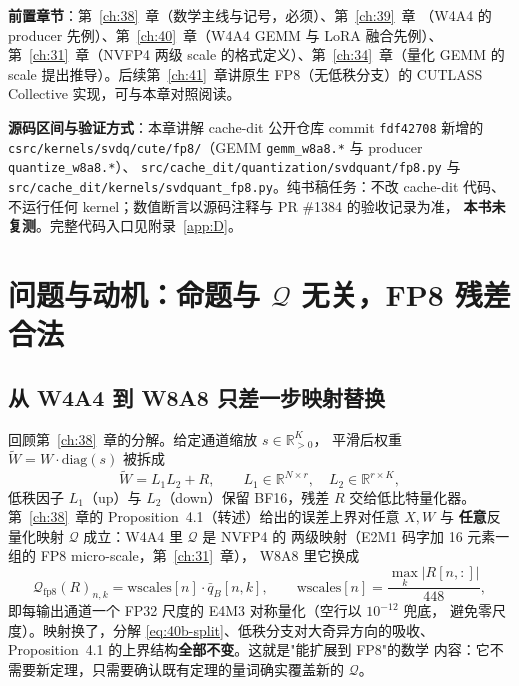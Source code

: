 \textbf{前置章节}：第~\ref{ch:38}~章（数学主线与记号，必须）、第~\ref{ch:39}~章
（W4A4 的 producer 先例）、第~\ref{ch:40}~章（W4A4 GEMM 与 LoRA 融合先例）、
第~\ref{ch:31}~章（NVFP4 两级 scale 的格式定义）、第~\ref{ch:34}~章（量化 GEMM
的 scale 提出推导）。后续第~\ref{ch:41}~章讲原生 FP8（无低秩分支）的 CUTLASS
Collective 实现，可与本章对照阅读。

\textbf{源码区间与验证方式}：本章讲解 cache-dit 公开仓库 commit
\texttt{fdf42708} 新增的 \texttt{csrc/kernels/svdq/cute/fp8/}（GEMM
\texttt{gemm\_w8a8.*} 与 producer \texttt{quantize\_w8a8.*}）、
\texttt{src/cache\_dit/quantization/svdquant/fp8.py} 与
\texttt{src/cache\_dit/kernels/svdquant\_fp8.py}。纯书稿任务：不改 cache-dit
代码、不运行任何 kernel；数值断言以源码注释与 PR \#1384 的验收记录为准，
\textbf{本书未复测}。完整代码入口见附录~\ref{app:D}。

\section{问题与动机：命题与 $\mathcal Q$ 无关，FP8 残差合法}\label{sec:40b-motivation}

\subsection{从 W4A4 到 W8A8 只差一步映射替换}

回顾第~\ref{ch:38}~章的分解。给定通道缩放 $s\in\mathbb{R}_{>0}^{K}$，
平滑后权重 $\widetilde W = W\cdot\mathrm{diag}(s)$ 被拆成
\begin{equation}
  \widetilde W = L_1 L_2 + R,
  \qquad
  L_1\in\mathbb{R}^{N\times r},\quad L_2\in\mathbb{R}^{r\times K},
  \label{eq:40b-split}
\end{equation}
低秩因子 $L_1$（up）与 $L_2$（down）保留 BF16，残差 $R$ 交给低比特量化器。
第~\ref{ch:38}~章的 Proposition~4.1（转述）给出的误差上界对任意 $X,W$ 与
\textbf{任意}反量化映射 $\mathcal Q$ 成立：W4A4 里 $\mathcal Q$ 是 NVFP4 的
两级映射（E2M1 码字加 16 元素一组的 FP8 micro-scale，第~\ref{ch:31}~章），
W8A8 里它换成
\begin{equation}
  \mathcal Q_{\mathrm{fp8}}(R)_{n,k}
    = \mathrm{wscales}[n]\cdot\bar q_B[n,k],
  \qquad
  \mathrm{wscales}[n]=\frac{\max_k |R[n,:]|}{448},
  \label{eq:40b-wq}
\end{equation}
即每输出通道一个 FP32 尺度的 E4M3 对称量化（空行以 $10^{-12}$ 兜底，
避免零尺度）。映射换了，分解
\eqref{eq:40b-split}、低秩分支对大奇异方向的吸收、
Proposition~4.1 的上界结构\textbf{全部不变}。这就是"能扩展到 FP8"的数学
内容：它不需要新定理，只需要确认既有定理的量词确实覆盖新的 $\mathcal Q$。

